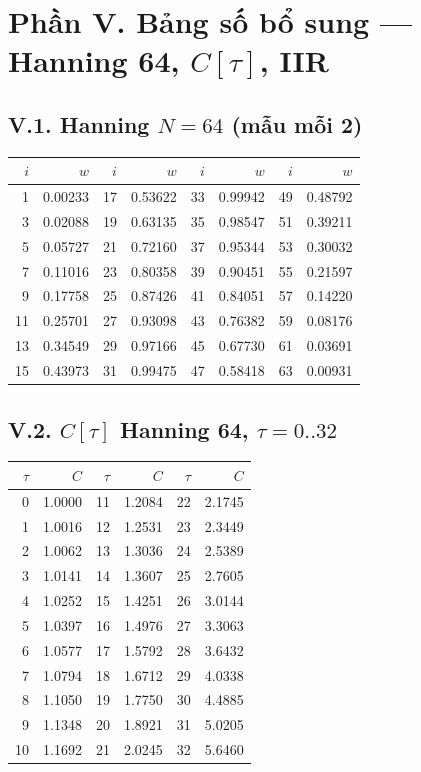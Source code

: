 \newpage\section*{Phần V. Bảng số bổ sung --- Hanning 64, $C[\tau]$, IIR}
\subsection*{V.1. Hanning $N=64$ (mẫu mỗi 2)}
\begin{center}\scriptsize\begin{tabular}{@{}rrrrrrrr@{}}
\toprule $i$ & $w$ & $i$ & $w$ & $i$ & $w$ & $i$ & $w$ \\ \midrule
1 & 0.00233 & 17 & 0.53622 & 33 & 0.99942 & 49 & 0.48792 \\
3 & 0.02088 & 19 & 0.63135 & 35 & 0.98547 & 51 & 0.39211 \\
5 & 0.05727 & 21 & 0.72160 & 37 & 0.95344 & 53 & 0.30032 \\
7 & 0.11016 & 23 & 0.80358 & 39 & 0.90451 & 55 & 0.21597 \\
9 & 0.17758 & 25 & 0.87426 & 41 & 0.84051 & 57 & 0.14220 \\
11 & 0.25701 & 27 & 0.93098 & 43 & 0.76382 & 59 & 0.08176 \\
13 & 0.34549 & 29 & 0.97166 & 45 & 0.67730 & 61 & 0.03691 \\
15 & 0.43973 & 31 & 0.99475 & 47 & 0.58418 & 63 & 0.00931 \\
\bottomrule\end{tabular}\end{center}
\subsection*{V.2. $C[\tau]$ Hanning 64, $\tau=0..32$}
\begin{center}\scriptsize\begin{tabular}{@{}rrrrrr@{}}
\toprule $\tau$ & $C$ & $\tau$ & $C$ & $\tau$ & $C$ \\ \midrule
0 & 1.0000 & 11 & 1.2084 & 22 & 2.1745 \\
1 & 1.0016 & 12 & 1.2531 & 23 & 2.3449 \\
2 & 1.0062 & 13 & 1.3036 & 24 & 2.5389 \\
3 & 1.0141 & 14 & 1.3607 & 25 & 2.7605 \\
4 & 1.0252 & 15 & 1.4251 & 26 & 3.0144 \\
5 & 1.0397 & 16 & 1.4976 & 27 & 3.3063 \\
6 & 1.0577 & 17 & 1.5792 & 28 & 3.6432 \\
7 & 1.0794 & 18 & 1.6712 & 29 & 4.0338 \\
8 & 1.1050 & 19 & 1.7750 & 30 & 4.4885 \\
9 & 1.1348 & 20 & 1.8921 & 31 & 5.0205 \\
10 & 1.1692 & 21 & 2.0245 & 32 & 5.6460 \\
\bottomrule\end{tabular}\end{center}
